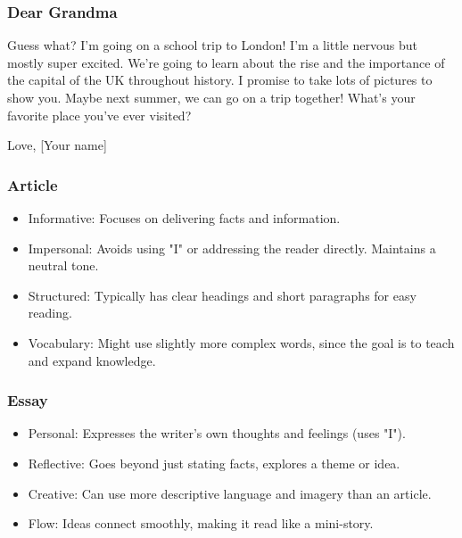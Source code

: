 \documentclass[]{article} %
\begin{document}
\subsubsection*{Dear Grandma}

Guess what? I'm going on a school trip to London! I'm a little nervous but mostly super excited. We're going to learn about the rise and the importance of the capital of the UK throughout history. I promise to take lots of pictures to show you. Maybe next summer, we can go on a trip together! What's your favorite place you've ever visited?

Love,
[Your name] \par 
\vspace{1cm}

\begin{minipage}[h]{0.9\textwidth}	
	
	\begin{multicols}{2}
		
		
		
		
		\centering
		\subsubsection*{Article}
		
		\begin{itemize}
			\item{Informative: Focuses on delivering facts and information.}
			\item{Impersonal: Avoids using "I" or addressing the reader directly. Maintains a neutral tone.}
			\item{Structured: Typically has clear headings and short paragraphs for easy reading.}
			\item{Vocabulary: Might use slightly more complex words, since the goal is to teach and expand knowledge.}
		\end{itemize}
		
		\subsubsection*{Essay}
		
		\begin{itemize}
			\item{Personal: Expresses the writer's own thoughts and feelings (uses "I").}
			\item{Reflective: Goes beyond just stating facts, explores a theme or idea.}
			\item{Creative: Can use more descriptive language and imagery than an article.}
			\item{Flow: Ideas connect smoothly, making it read like a mini-story.}
		\end{itemize}
		

\end{multicols}
\end{minipage}
\end{document}
